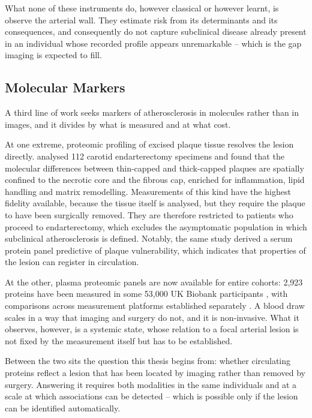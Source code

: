 What none of these instruments do, however classical or however learnt, is observe the arterial
wall. They estimate risk from its determinants and its consequences, and consequently do not
capture subclinical disease already present in an individual whose recorded profile appears
unremarkable -- which is the gap imaging is expected to fill.

\subsection{Molecular Markers}

A third line of work seeks markers of atherosclerosis in molecules rather than in images, and it
divides by what is measured and at what cost.

At one extreme, proteomic profiling of excised plaque tissue resolves the lesion directly.
\textcite{sinha2026proteomics} analysed 112 carotid endarterectomy specimens and found that the
molecular differences between thin-capped and thick-capped plaques are spatially confined to the
necrotic core and the fibrous cap, enriched for inflammation, lipid handling and matrix
remodelling. Measurements of this kind have the highest fidelity available, because the tissue
itself is analysed, but they require the plaque to have been surgically removed. They are
therefore restricted to patients who proceed to endarterectomy, which excludes the asymptomatic
population in which subclinical atherosclerosis is defined. Notably, the same study derived a
serum protein panel predictive of plaque vulnerability, which indicates that properties of the
lesion can register in circulation.

At the other, plasma proteomic panels are now available for entire cohorts: 2{,}923 proteins have
been measured in some 53{,}000 UK Biobank participants \cite{sun2023plasma}, with comparisons
across measurement platforms established separately \cite{eldjarn2023plasma}. A blood draw
scales in a way that imaging and surgery do not, and it is non-invasive. What it observes,
however, is a systemic state, whose relation to a focal arterial lesion is not fixed by the
measurement itself but has to be established.

Between the two sits the question this thesis begins from: whether circulating proteins reflect a
lesion that has been located by imaging rather than removed by surgery. Answering it requires
both modalities in the same individuals and at a scale at which associations can be detected --
which is possible only if the lesion can be identified automatically.

